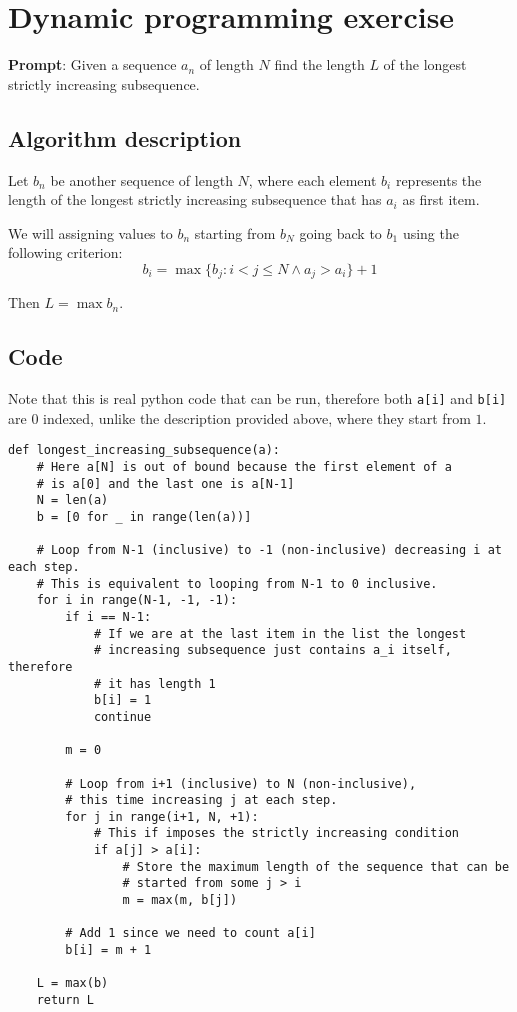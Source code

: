 \documentclass[12pt]{extarticle}
\author{Giacomo Ellero}
\numberwithin{table}{section}
\numberwithin{figure}{section}
\theoremstyle{definition}
\begin{document}
\section*{Dynamic programming exercise}

\textbf{Prompt}: Given a sequence $a_n$ of length $N$ find the length $L$ of the longest strictly increasing subsequence.

\subsection*{Algorithm description}

Let $b_n$ be another sequence of length $N$, where each element $b_i$ represents the length of the longest strictly increasing subsequence that has $a_i$ as first item.

We will assigning values to $b_n$ starting from $b_N$ going back to $b_1$ using the following criterion:
\begin{equation}
    \label{main_eq}
    b_i = \max \{ b_{j} : i < j \leq N \land a_j > a_i \} + 1
\end{equation}

Then $L = \max b_n$.

\subsection*{Code}

Note that this is real python code that can be run, therefore both \texttt{a[i]} and \texttt{b[i]} are $0$ indexed,
unlike the description provided above, where they start from $1$.

\begin{verbatim}
def longest_increasing_subsequence(a):
    # Here a[N] is out of bound because the first element of a
    # is a[0] and the last one is a[N-1]
    N = len(a)
    b = [0 for _ in range(len(a))]

    # Loop from N-1 (inclusive) to -1 (non-inclusive) decreasing i at each step.
    # This is equivalent to looping from N-1 to 0 inclusive.
    for i in range(N-1, -1, -1):
        if i == N-1:
            # If we are at the last item in the list the longest
            # increasing subsequence just contains a_i itself, therefore
            # it has length 1
            b[i] = 1
            continue

        m = 0

        # Loop from i+1 (inclusive) to N (non-inclusive),
        # this time increasing j at each step.
        for j in range(i+1, N, +1):
            # This if imposes the strictly increasing condition
            if a[j] > a[i]:
                # Store the maximum length of the sequence that can be 
                # started from some j > i
                m = max(m, b[j])

        # Add 1 since we need to count a[i]
        b[i] = m + 1

    L = max(b)
    return L
\end{verbatim}
\end{document}
